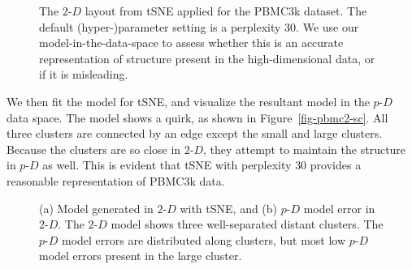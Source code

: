 \documentclass[
  12pt]{article}
\newcommand\pD{$p\text{-}D$}
\newcommand\gD{$2\text{-}D$}
\begin{document}
\begin{figure}[H]


\caption{\label{fig-tsne-suggest}The \(2\text{-}D\) layout from tSNE
applied for the PBMC3k dataset. The default (hyper-)parameter setting is
a perplexity \(30\). We use our model-in-the-data-space to assess
whether this is an accurate representation of structure present in the
high-dimensional data, or if it is misleading.}

\end{figure}%

We then fit the model for tSNE, and visualize the resultant model in the
\pD{} data space. The model shows a quirk, as shown in
Figure~\ref{fig-pbmc2-sc}. All three clusters are connected by an edge
except the small and large clusters. Because the clusters are so close
in \gD{}, they attempt to maintain the structure in \pD{} as well. This
is evident that tSNE with perplexity \(30\) provides a reasonable
representation of PBMC3k data.

\begin{figure}[H]


\caption{\label{fig-model-pbmc}(a) Model generated in \(2\text{-}D\)
with tSNE, and (b) \(p\text{-}D\) model error in \(2\text{-}D\). The
\(2\text{-}D\) model shows three well-separated distant clusters. The
\(p\text{-}D\) model errors are distributed along clusters, but most low
\(p\text{-}D\) model errors present in the large cluster.}

\end{figure}%
\end{document}
